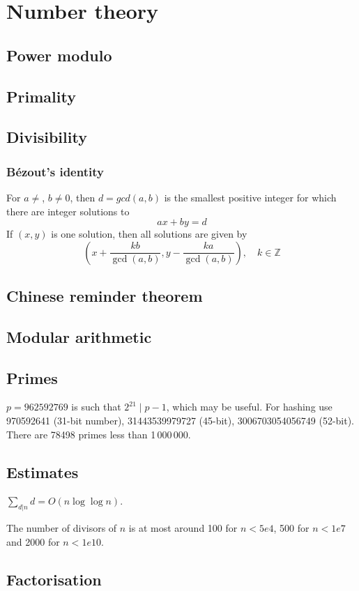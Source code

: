 
\chapter{Number theory}

	\section{Power modulo}

	\section{Primality}

	\section{Divisibility}
		\subsection{Bézout's identity}
		For $a \neq $, $b \neq 0$, then $d=gcd(a,b)$ is the smallest positive integer for which there are integer solutions to
		$$ax+by=d$$
		If $(x,y)$ is one solution, then all solutions are given by
		$$\left(x+\frac{kb}{\gcd(a,b)}, y-\frac{ka}{\gcd(a,b)}\right), \quad k\in\mathbb{Z}$$
		
		
		

	\section{Chinese reminder theorem}

	\section{Modular arithmetic}

	\section{Primes}
		$p=962592769$ is such that $2^{21} \mid p-1$, which may be useful. For hashing
		use 970592641 (31-bit number), 31443539979727 (45-bit), 3006703054056749
		(52-bit). There are 78498 primes less than 1\,000\,000.

	\section{Estimates}
		$\sum_{d|n} d = O(n \log \log n)$.
		
		The number of divisors of $n$ is at most around 100 for $n < 5e4$, 500 for $n < 1e7$ and 2000 for $n < 1e10$.

	\section{Factorisation}
